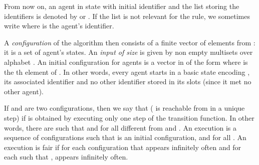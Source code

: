 \documentclass[UKenglish]{llncs}
\begin{document}
  From now on, an agent in state  with initial identifier  and
   the list storing the  identifiers is denoted
  by  or .  If the list  is not
  relevant for the rule, we sometimes write  where  is the agent's identifier.


A \emph{configuration}  of the algorithm then consists of a finite vector of
elements from :  it is a set of  agent's states.
An \emph{input of size } is given by  non empty multisets 
over alphabet .
An initial configuration for  agents is a vector in 
of the form 
where  is the th element of . In other words, every agent 
starts in a basic state encoding , its associated
identifier  and
no other identifier stored in its  slots (since it met no other agent). 



 If  and  are two
configurations, then we say that  ( is reachable from 
in a unique step) if   is obtained by executing only one step of the transition function. In other words,  there are  such that
 and  for all  different
from  and . An execution is a sequence of configurations  such that  is an initial configuration, and  for all . An execution is fair if for each
configuration  that appears infinitely often and for each 
such that ,  appears infinitely often.
 
\end{document}
